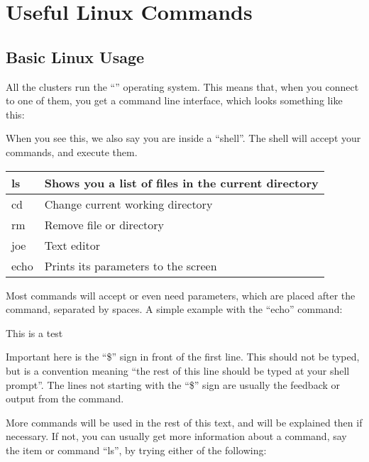 \chapter{Useful Linux Commands}
\label{ch:useful-linux-commands}

\section{Basic Linux Usage}

All the \hpc clusters run the ``\operatingsystembase'' operating system.  This
means that, when you connect to one of them, you get a command line interface,
which looks something like this:

\begin{prompt}
\end{prompt}

When you see this, we also say you are inside a ``shell''. The shell will accept
your commands, and execute them.

\begin{tabular}{|p{}|p{}|} \hline
ls   & Shows you a list of files in the current directory \\ \hline
cd   & Change current working directory \\ \hline
rm   & Remove file or directory \\ \hline
joe  & Text editor \\ \hline
echo & Prints its parameters to the screen \\ \hline
\end{tabular}

Most commands will accept or even need parameters, which are placed after the
command, separated by spaces. A simple example with the ``echo'' command:

\begin{prompt}
This is a test
\end{prompt}

Important here is the ``\$'' sign in front of the first line. This should not be
typed, but is a convention meaning ``the rest of this line should be typed at
your shell prompt''. The lines not starting with the ``\$'' sign are usually the
feedback or output from the command.

More commands will be used in the rest of this text, and will be explained then
if necessary. If not, you can usually get more information about a command, say
the item or command ``ls'', by trying either of the following:

